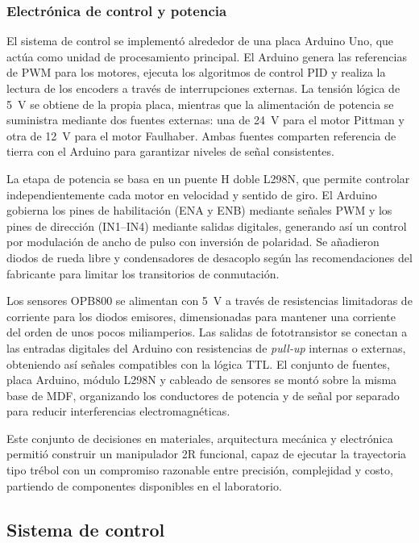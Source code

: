 \documentclass[11pt,a4paper]{article}
\begin{document}
\subsubsection{Electrónica de control y potencia}

El sistema de control se implementó alrededor de una placa Arduino Uno, que actúa como unidad de procesamiento principal. El Arduino genera las referencias de PWM para los motores, ejecuta los algoritmos de control PID y realiza la lectura de los encoders a través de interrupciones externas. La tensión lógica de \SI{5}{\volt} se obtiene de la propia placa, mientras que la alimentación de potencia se suministra mediante dos fuentes externas: una de \SI{24}{\volt} para el motor Pittman y otra de \SI{12}{\volt} para el motor Faulhaber. Ambas fuentes comparten referencia de tierra con el Arduino para garantizar niveles de señal consistentes.

La etapa de potencia se basa en un puente H doble L298N, que permite controlar independientemente cada motor en velocidad y sentido de giro. El Arduino gobierna los pines de habilitación (ENA y ENB) mediante señales PWM y los pines de dirección (IN1–IN4) mediante salidas digitales, generando así un control por modulación de ancho de pulso con inversión de polaridad. Se añadieron diodos de rueda libre y condensadores de desacoplo según las recomendaciones del fabricante para limitar los transitorios de conmutación.

Los sensores OPB800 se alimentan con \SI{5}{\volt} a través de resistencias limitadoras de corriente para los diodos emisores, dimensionadas para mantener una corriente del orden de unos pocos miliamperios. Las salidas de fototransistor se conectan a las entradas digitales del Arduino con resistencias de \emph{pull-up} internas o externas, obteniendo así señales compatibles con la lógica TTL. El conjunto de fuentes, placa Arduino, módulo L298N y cableado de sensores se montó sobre la misma base de MDF, organizando los conductores de potencia y de señal por separado para reducir interferencias electromagnéticas.

Este conjunto de decisiones en materiales, arquitectura mecánica y electrónica permitió construir un manipulador 2R funcional, capaz de ejecutar la trayectoria tipo trébol con un compromiso razonable entre precisión, complejidad y costo, partiendo de componentes disponibles en el laboratorio.




\subsection{Sistema de control}
\end{document}
